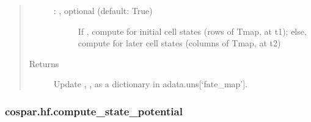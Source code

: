 \documentclass[letterpaper,10pt,english]{sphinxmanual}
\begin{document}
\begin{fulllineitems}
\begin{quote}
\begin{description}
\begin{description}
\item[{ : , optional (default: True)}] \leavevmode
If , compute for initial cell states (rows of Tmap, at t1);
else, compute for later cell states (columns of Tmap, at t2)

\end{description}

\item[{Returns}] \leavevmode
Update , ,  as a dictionary in adata.uns{[}‘fate\_map’{]}.

\end{description}\end{quote}

\end{fulllineitems}



\subsubsection{cospar.hf.compute\_state\_potential}
\label{\detokenize{cospar.hf.compute_state_potential:cospar-hf-compute-state-potential}}\label{\detokenize{cospar.hf.compute_state_potential::doc}}
\end{document}
